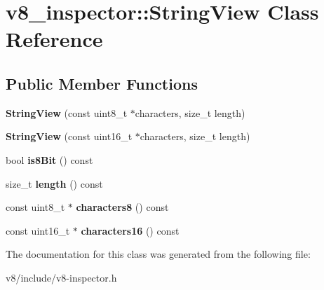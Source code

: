 \hypertarget{classv8__inspector_1_1StringView}{}\section{v8\+\_\+inspector\+:\+:String\+View Class Reference}
\label{classv8__inspector_1_1StringView}
\subsection*{Public Member Functions}
\begin{DoxyCompactItemize}
\item 
\mbox{\label{classv8__inspector_1_1StringView_aafc4d42555f35f95d6c2264432b89995}} 
{\bfseries String\+View} (const uint8\+\_\+t $\ast$characters, size\+\_\+t length)
\item 
\mbox{\label{classv8__inspector_1_1StringView_acb0f9ca01c2e1d55e7f94e6b1421d76e}} 
{\bfseries String\+View} (const uint16\+\_\+t $\ast$characters, size\+\_\+t length)
\item 
\mbox{\label{classv8__inspector_1_1StringView_ab2c2899bfa07d0bc745b8a01592a761a}} 
bool {\bfseries is8\+Bit} () const
\item 
\mbox{\label{classv8__inspector_1_1StringView_a2e851af43b41d8af7978c8b2480cbb34}} 
size\+\_\+t {\bfseries length} () const
\item 
\mbox{\label{classv8__inspector_1_1StringView_a5e5f5f3ec476455ebdf526cb26a468f7}} 
const uint8\+\_\+t $\ast$ {\bfseries characters8} () const
\item 
\mbox{\label{classv8__inspector_1_1StringView_abf54908b25a843c15f482328f5b1206f}} 
const uint16\+\_\+t $\ast$ {\bfseries characters16} () const
\end{DoxyCompactItemize}


The documentation for this class was generated from the following file\+:\begin{DoxyCompactItemize}
\item 
v8/include/v8-\/inspector.\+h\end{DoxyCompactItemize}
